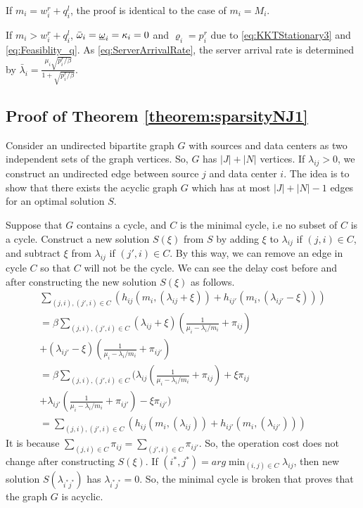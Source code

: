 If $m_i = w^r_i+q^l_i$, the proof is identical to the case of $m_i = M_i$.

If $m_i > w^r_i+q^l_i$, $\bar{\omega}_i = \underbar{$\omega$}_i = \kappa_i=0$ and $\varrho_i = p^r_i$ due to \eqref{eq:KKTStationary3} and \eqref{eq:Feasiblity_q}. As \eqref{eq:ServerArrivalRate}, the server arrival rate is determined by $\bar{\lambda}_i = \frac{\mu_i\sqrt{p^r_i/\beta}}{1+\sqrt{p^r_i/\beta}}$. 

\subsection{Proof of Theorem \ref{theorem:sparsityNJ1}}
\label{proof:sparsityNJ1}

Consider an undirected bipartite graph $G$ with sources and data centers as two independent sets of the graph vertices. So, $G$ has $|J|+|N|$ vertices. If $\lambda_{ij}>0$, we construct an undirected edge between source $j$ and data center $i$. The idea is to show that there exists the acyclic graph $G$ which has at most $|J|+|N|-1$ edges for an optimal solution $S$.

Suppose that $G$ contains a cycle, and $C$ is the minimal cycle, i.e no subset of $C$ is a cycle. Construct a new solution $S(\xi)$ from $S$ by adding $\xi$ to $\lambda_{ij}$ if $(j,i) \in C$, and subtract $\xi$ from $\lambda_{ij}$ if $(j',i) \in C$. By this way, we can remove an edge in cycle $C$ so that $C$ will not be the cycle. We can see the delay cost before and after constructing the new solution $S(\xi)$ as follows.
\begin{eqnarray}
\sum_{(j,i),(j',i) \in C}^{}(h_{ij}(m_i,(\lambda_{ij}+\xi))+h_{ij'}(m_i,(\lambda_{ij'}-\xi))) \\
= \beta \sum_{(j,i),(j',i) \in C}^{}(\lambda_{ij}+\xi)(\frac{1}{\mu_i - \lambda_i/m_i}  + \pi_{ij}) \nonumber \\ 
+(\lambda_{ij'}-\xi)(\frac{1}{\mu_i - \lambda_i/m_i} + \pi_{ij'}) \\
= \beta \sum_{(j,i),(j',i) \in C} \big (\lambda_{ij}(\frac{1}{\mu_i - \lambda_i/m_i}+\pi_{ij})+\xi\pi_{ij} \nonumber \\
+\lambda_{ij'}(\frac{1}{\mu_i - \lambda_i/m_i}+\pi_{ij'})-\xi\pi_{ij'} \big) \\
= \sum_{(j,i),(j',i) \in C}^{}(h_{ij}(m_i,(\lambda_{ij}))+h_{ij'}(m_i,(\lambda_{ij'})))
\end{eqnarray}
It is because $\sum_{(j,i)\in C} \pi_{ij}=\sum_{(j',i) \in C}\pi_{ij'}$. So, the operation cost does not change after constructing $S(\xi)$. If $(i^*, j^*)=arg\min_{(i,j)\in C}\lambda_{ij}$, then new solution $S(\lambda_{i^*j^*})$ has $\lambda_{i^*j^*}=0$. So, the minimal cycle is broken that proves that the graph $G$ is acyclic.

